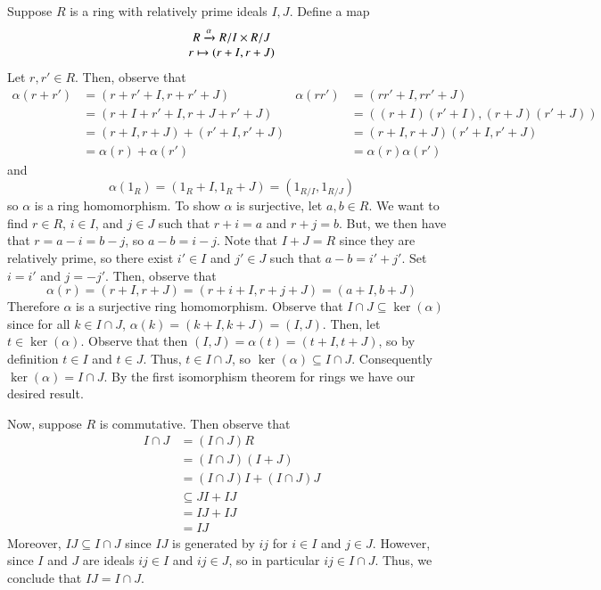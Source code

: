 \documentclass[12pt, a4paper, twoside, openright, titlepage]{book}
\begin{document}
\begin{proof*}{}{}
    Suppose $R$ is a ring with relatively prime ideals $I, J$. Define a map $$\begin{array}{c} R\xrightarrow{\alpha} R/I \times R/J \\ r \mapsto (r+I, r+J) \end{array}$$
    Let $r,r' \in R$. Then, observe that \begin{align*}
        \alpha(r+r') &= (r+r' + I, r+r' + J) & \alpha(rr') &= (rr' + I, rr' + J) \\
        &= (r+I+r'+I,r+J + r'+J) & &= ((r+I)(r'+I),(r+J)(r'+J)) \\
        &= (r+I,r+J)+(r'+I,r'+J) & &= (r+I,r+J)(r'+I,r'+J) \\
        &= \alpha(r) + \alpha(r') & &= \alpha(r)\alpha(r')
    \end{align*}
    and $$\alpha(1_R) = (1_R + I, 1_R+J) = (1_{R/I},1_{R/J})$$
    so $\alpha$ is a ring homomorphism. To show $\alpha$ is surjective, let $a,b \in R$. We want to find $r \in R$, $i \in I$, and $j \in J$ such that $r+i = a$ and $r+j = b$. But, we then have that $r = a-i = b-j$, so $a-b = i-j$. Note that $I+J = R$ since they are relatively prime, so there exist $i' \in I$ and $j' \in J$ such that $a-b = i' + j'$. Set $i = i'$ and $j = -j'$. Then, observe that $$\alpha(r) = (r+I,r+J) = (r+i + I, r+j + J) = (a+I, b+J)$$
    Therefore $\alpha$ is a surjective ring homomorphism. Observe that $I\cap J \subseteq \ker(\alpha)$ since for all $k \in I \cap J$, $\alpha(k) = (k+I,k+J) = (I,J)$. Then, let $t \in \ker(\alpha)$. Observe that then $(I,J) = \alpha(t) = (t+I,t+J)$, so by definition $t \in I$ and $t \in J$. Thus, $t \in I \cap J$, so $\ker(\alpha) \subseteq I \cap J$. Consequently $\ker(\alpha) = I \cap J$. By the first isomorphism theorem for rings we have our desired result. 
    
    
    Now, suppose $R$ is commutative. Then observe that \begin{align*}
        I \cap J &= (I\cap J)R \\
        &= (I\cap J)(I+J) \\
        &= (I\cap J)I + (I\cap J)J \\
        &\subseteq JI + IJ \\
        &= IJ + IJ \\
        &= IJ
    \end{align*}
    Moreover, $IJ \subseteq I \cap J$ since $IJ$ is generated by $ij$ for $i \in I$ and $j \in J$. However, since $I$ and $J$ are ideals $ij \in I$ and $ij \in J$, so in particular $ij \in I \cap J$. Thus, we conclude that $IJ = I\cap J$.
\end{proof*}
\end{document}
